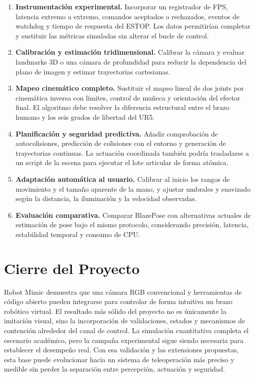 \begin{enumerate}
    \item \textbf{Instrumentación experimental.} Incorporar un registrador de
    FPS, latencia extremo a extremo, comandos aceptados o rechazados, eventos
    de watchdog y tiempo de respuesta del ESTOP. Los datos permitirían completar
    y sustituir las métricas simuladas sin alterar el bucle de control.

    \item \textbf{Calibración y estimación tridimensional.} Calibrar la cámara
    y evaluar landmarks 3D o una cámara de profundidad para reducir la
    dependencia del plano de imagen y estimar trayectorias cartesianas.

    \item \textbf{Mapeo cinemático completo.} Sustituir el mapeo lineal de dos
    joints por cinemática inversa con límites, control de muñeca y orientación
    del efector final. El algoritmo debe resolver la diferencia estructural
    entre el brazo humano y los seis grados de libertad del UR5.

    \item \textbf{Planificación y seguridad predictiva.} Añadir comprobación
    de autocolisiones, predicción de colisiones con el entorno y generación de
    trayectorias continuas. La actuación coordinada también podría trasladarse
    a un script de la escena para ejecutar el lote articular de forma atómica.

    \item \textbf{Adaptación automática al usuario.} Calibrar al inicio los
    rangos de movimiento y el tamaño aparente de la mano, y ajustar umbrales y
    suavizado según la distancia, la iluminación y la velocidad observadas.

    \item \textbf{Evaluación comparativa.} Comparar BlazePose con alternativas
    actuales de estimación de pose bajo el mismo protocolo, considerando
    precisión, latencia, estabilidad temporal y consumo de CPU.
\end{enumerate}

\section{Cierre del Proyecto}
\label{sec:cierre_proyecto}

Robot Mimic demuestra que una cámara RGB convencional y herramientas de código
abierto pueden integrarse para controlar de forma intuitiva un brazo robótico
virtual. El resultado más sólido del proyecto no es únicamente la imitación
visual, sino la incorporación de validaciones, estados y mecanismos de
contención alrededor del canal de control. La simulación cuantitativa completa
el escenario académico, pero la campaña experimental sigue siendo necesaria
para establecer el desempeño real. Con esa validación y las extensiones
propuestas, esta base puede evolucionar hacia un sistema de teleoperación más
preciso y medible sin perder la separación entre percepción, actuación y
seguridad.
